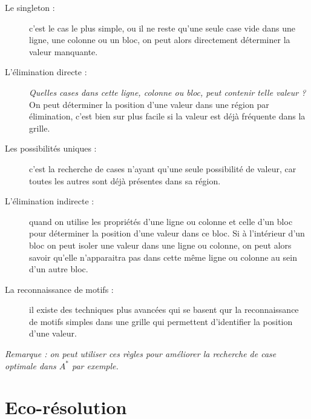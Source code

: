         \begin{description}
       \item[Le singleton :] c'est le cas le plus simple, ou il ne reste qu'une seule case vide dans une ligne, une colonne ou un bloc, on peut alors directement déterminer la valeur manquante.

        \item[L'élimination directe :] \textit{Quelles cases dans cette ligne, colonne ou bloc, peut contenir telle valeur ?} On peut déterminer la position d'une valeur dans une région par élimination, c'est bien sur plus facile si la valeur est déjà fréquente dans la grille.

        \item[Les possibilités uniques :] c'est la recherche de cases n'ayant qu'une seule possibilité de valeur, car toutes les autres sont déjà présentes dans sa région.

        \item[L'élimination indirecte :] quand on utilise les propriétés d'une ligne ou colonne et celle d'un bloc pour déterminer la position d'une valeur dans ce bloc. Si à l'intérieur d'un bloc on peut isoler une valeur dans une ligne ou colonne, on peut alors savoir qu'elle n'apparaitra pas dans cette même ligne ou colonne au sein d'un autre bloc.

       \item[La reconnaissance de motifs :] il existe des techniques plus avancées qui se basent qur la reconnaissance de motifs simples dans une grille qui permettent d'identifier la position d'une valeur.


        \end{description}

\textit{Remarque : on peut utiliser ces règles pour améliorer la recherche de case optimale dans $A^*$ par exemple.}






	\section{Eco-résolution}
